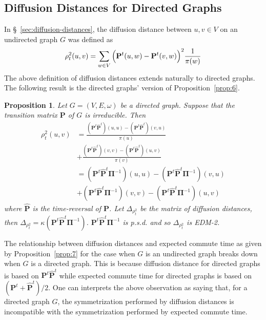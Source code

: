 \documentclass[10pt,twocolumn]{article}
\newtheorem{proposition}[theorem]{Proposition}
\numberwithin{equation}{section}
\begin{document}
\subsection{Diffusion Distances for Directed Graphs}
\label{sec:diff-dist-direct}
In \S~\ref{sec:diffusion-distances}, the diffusion distance between $u,v
\in V$ on an undirected graph $G$ was defined as
\begin{equation*}
  \rho^{2}_{t}(u,v) = \sum_{w \in V}{\Bigl(\mathbf{P}^{t}(u,w) -
      \mathbf{P}^{t}(v,w)\Bigr)^2 \frac{1}{\pi(w)}}
\end{equation*}
The above definition of diffusion distances extends naturally to
directed graphs. The following result is the directed graphs' version
of Proposition~\ref{prop:6}.
\begin{proposition}
  \label{prop:11}
  Let $G = (V,E,\omega)$ be a directed graph. Suppose that
  the transition matrix $\mathbf{P}$ of $G$ is irreducible. Then
  \begin{equation*}
     \begin{split}
      \rho_{t}^{2}(u,v) &= \frac{(\mathbf{P}^{t}\hat{\mathbf{P}}^{t})(u,u) -
        (\mathbf{P}^{t}\hat{\mathbf{P}}^{t})(v,u)}{\pi(u)} \\ &+
      \frac{(\mathbf{P}^{t}\hat{\mathbf{P}}^{t})(v,v) -
        (\mathbf{P}^{t}\hat{\mathbf{P}}^{t})(u,v)}{\pi(v)}  \\
      &= (\mathbf{P}^{t}\hat{\mathbf{P}}^{t}\bm{\Pi}^{-1})(u,u) -
      (\mathbf{P}^{t}\hat{\mathbf{P}}^{t}\bm{\Pi}^{-1})(v,u) \\
      &+ (\mathbf{P}^{t}\hat{\mathbf{P}}^{t}\bm{\Pi}^{-1})(v,v) -
      (\mathbf{P}^{t}\hat{\mathbf{P}}^{t}\bm{\Pi}^{-1})(u,v)
    \end{split}
  \end{equation*}
  where $\hat{\mathbf{P}}$ is the time-reversal of $\mathbf{P}$. Let
  $\Delta_{\rho_t^2}$ be the matrix of diffusion distances,
  then $\Delta_{\rho_t^2} =
  \kappa(\mathbf{P}^{t}\hat{\mathbf{P}}^{t}\bm{\Pi}^{-1})$. 
  $\mathbf{P}^{t}\hat{\mathbf{P}}^{t}\bm{\Pi}^{-1}$
  is p.s.d. and so $\Delta_{\rho_t^2}$ is EDM-2.
\end{proposition}
The relationship between diffusion distances and expected commute time
as given by Proposition~\ref{prop:7} for the case when $G$ is an
undirected graph breaks down when $G$ is a directed graph. This is
because diffusion distance for directed graphs is based on
$\mathbf{P}^{t}\hat{\mathbf{P}}^{t}$ while expected commute time for
directed graphs is based on $(\mathbf{P}^{t} +
\hat{\mathbf{P}}^{t})/2$. One can interprets the above observation
as saying that, for a directed graph $G$, the symmetrization performed by
diffusion distances is incompatible with the symmetrization performed
by expected commute time.
\end{document}
